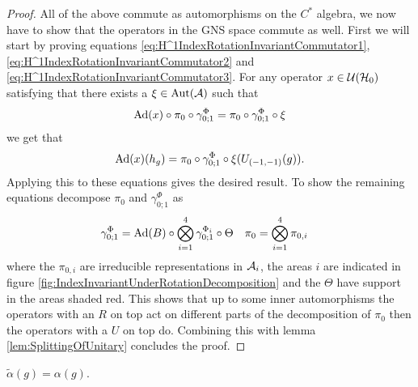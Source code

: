 \documentclass[11pt,a4paper,twoside]{article}
\numberwithin{equation}{section}
\begin{document}
\begin{proof}
	All of the above commute as automorphisms on the $C^*$ algebra, we now have to show that the operators in the GNS space commute as well. First we will start by proving equations \eqref{eq:H^1IndexRotationInvariantCommutator1}, \eqref{eq:H^1IndexRotationInvariantCommutator2} and \eqref{eq:H^1IndexRotationInvariantCommutator3}. For any operator $x\in\UU(\HH_0)$ satisfying that there exists a $\xi\in\Aut{\AA}$ such that
	\begin{equation}
		\Ad{x}\circ\pi_0\circ\gamma^{\Phi}_{0;1}=\pi_0\circ\gamma^{\Phi}_{0;1}\circ\xi
	\end{equation}
	we get that
	\begin{equation}
		\Ad{x}(h_g)=\pi_0\circ\gamma^\Phi_{0;1}\circ\xi(U_{(-1,-1)}(g)).
	\end{equation}
	Applying this to these equations gives the desired result. To show the remaining equations decompose $\pi_0$ and $\gamma^\Phi_{0;1}$ as
	\begin{align}
		\gamma^\Phi_{0;1}&=\Ad{B}\circ\bigotimes_{i=1}^4\gamma^{\Phi_i}_{0;1}\circ\Theta&\pi_0&=\bigotimes_{i=1}^4\pi_{0,i}
	\end{align}
	where the $\pi_{0,i}$ are irreducible representations in $\AA_i$, the areas $i$ are indicated in figure \ref{fig:IndexInvariantUnderRotationDecomposition} and the $\Theta$ have support in the areas shaded red. This shows that up to some inner automorphisms the operators with an $R$ on top act on different parts of the decomposition of $\pi_0$ then the operators with a $U$ on top do. Combining this with lemma \ref{lem:SplittingOfUnitary} concludes the proof.
\end{proof}
\begin{lemma}
	$\tilde{\alpha}(g)=\alpha(g)$.
\end{lemma}
\end{document}

